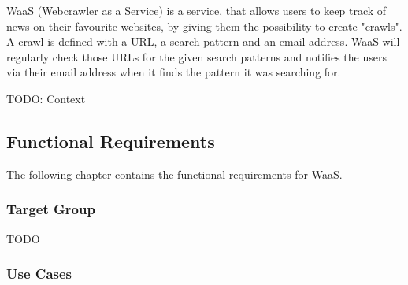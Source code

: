 \documentclass[titlepage, 12pt]{article}
\begin{document}
WaaS (Webcrawler as a Service) is a service, that allows users to keep track of news on their favourite websites, by giving them the possibility to create "crawls". A crawl is defined with a URL, a search pattern and an email address. WaaS will regularly check those URLs for the given search patterns and notifies the users via their email address when it finds the pattern it was searching for.

TODO: Context

\subsection{Functional Requirements}

The following chapter contains the functional requirements for WaaS.

\subsubsection{Target Group}

TODO

\subsubsection{{Use Cases}}
\end{document}
